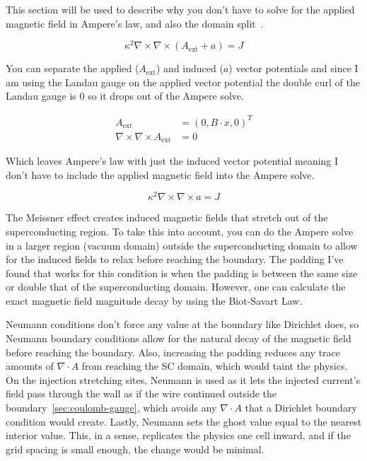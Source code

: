 \documentclass[11pt]{article}
\theoremstyle{definition}
\begin{document}
This section will be used to describe why you don't have to solve for the applied magnetic field in Ampere's law, and also the domain split~\cite{oripov2020}.

\begin{equation}
\label{eq:ampere-split}
\kappa^2 \nabla \times \nabla \times (A_{\mathrm{ext}} + a) = J
\end{equation}

You can separate the applied ($A_{\mathrm{ext}}$) and induced ($a$) vector potentials and since I am using the Landau gauge on the applied vector potential the double curl of the Landau gauge is 0 so it drops out of the Ampere solve.

\begin{align}
A_{\mathrm{ext}} &= (0, B \cdot x, 0)^T \label{eq:Aext}\\
\nabla \times \nabla \times A_{\mathrm{ext}} &= 0 \label{eq:Aext-curl}
\end{align}

Which leaves Ampere's law with just the induced vector potential meaning I don't have to include the applied magnetic field into the Ampere solve.

\begin{equation}
\label{eq:ampere-induced}
\kappa^2 \nabla \times \nabla \times a = J
\end{equation}

The Meissner effect creates induced magnetic fields that stretch out of the superconducting region. To take this into account, you can do the Ampere solve in a larger region (vacuum domain) outside the superconducting domain to allow for the induced fields to relax before reaching the boundary. The padding I've found that works for this condition is when the padding is between the same size or double that of the superconducting domain. However, one can calculate the exact magnetic field magnitude decay by using the Biot-Savart Law.

Neumann conditions don't force any value at the boundary like Dirichlet does, so Neumann boundary conditions allow for the natural decay of the magnetic field before reaching the boundary. Also, increasing the padding reduces any trace amounts of $\nabla \cdot A$ from reaching the SC domain, which would taint the physics. On the injection stretching sites, Neumann is used as it lets the injected current's field pass through the wall as if the wire continued outside the boundary~\ref{sec:coulomb-gauge}, which avoids any $\nabla \cdot A$ that a Dirichlet boundary condition would create. Lastly, Neumann sets the ghost value equal to the nearest interior value. This, in a sense, replicates the physics one cell inward, and if the grid spacing is small enough, the change would be minimal.
\end{document}
